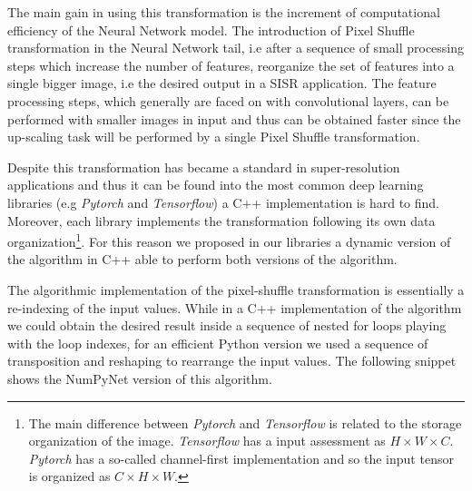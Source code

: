 \documentclass{standalone}
\begin{document}
The main gain in using this transformation is the increment of computational efficiency of the Neural Network model.
The introduction of Pixel Shuffle transformation in the Neural Network tail, i.e after a sequence of small processing steps which increase the number of features, reorganize the set of features into a single bigger image, i.e the desired output in a SISR application.
The feature processing steps, which generally are faced on with convolutional layers, can be performed with smaller images in input and thus can be obtained faster since the up-scaling task will be performed by a single Pixel Shuffle transformation.

Despite this transformation has became a standard in super-resolution applications and thus it can be found into the most common deep learning libraries (e.g \emph{Pytorch} and \emph{Tensorflow}) a C++ implementation is hard to find.
Moreover, each library implements the transformation following its own data organization\footnote{
  The main difference between \emph{Pytorch} and \emph{Tensorflow} is related to the storage organization of the image.
  \emph{Tensorflow} has a  input assessment as $H \times W \times C$.
  \emph{Pytorch} has a so-called channel-first implementation and so the input tensor is organized as $C \times H \times W$.
}.
For this reason we proposed in our libraries a dynamic version of the algorithm in C++ able to perform both versions of the algorithm.

The algorithmic implementation of the pixel-shuffle transformation is essentially a re-indexing of the input values.
While in a C++ implementation of the algorithm we could obtain the desired result inside a sequence of nested for loops playing with the loop indexes, for an efficient Python version we used a sequence of transposition and reshaping to rearrange the input values.
The following snippet shows the NumPyNet version of this algorithm.
\end{document}
